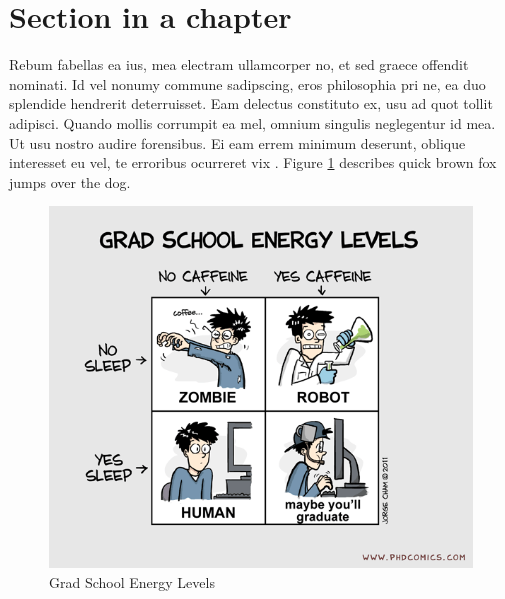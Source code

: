 \documentclass[copyright, reqno]{vcuthesis}
\numberwithin{equation}{chapter}
\begin{document}
\section{ Section in a chapter \label{sec:background} }
Rebum fabellas ea ius, mea electram ullamcorper no, et sed graece offendit nominati. Id vel nonumy commune sadipscing, eros philosophia pri ne, ea duo splendide hendrerit deterruisset. Eam delectus constituto ex, usu ad quot tollit adipisci. Quando mollis corrumpit ea mel, omnium singulis neglegentur id mea. Ut usu nostro audire forensibus. Ei eam errem minimum deserunt, oblique interesset eu vel, te erroribus ocurreret vix \cite{Narendra_1990}. Figure \ref{fig:fig1} describes quick brown fox jumps over the dog.

\begin{figure}
\centering
\includegraphics[scale=0.6]{figures/phd.png}
\caption{Grad School Energy Levels}
\label{fig:fig1}
\end{figure}

\begin{table}
	\caption{\label{table:t1} Table Title}
	\vspace{0.15in}
	\centering
\end{table}
\end{document}
